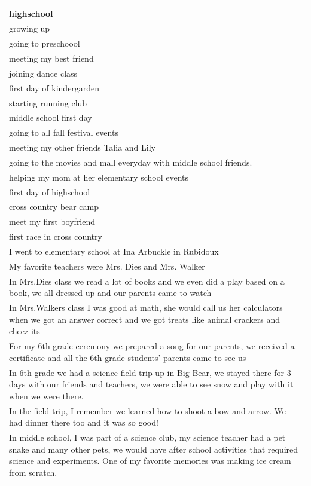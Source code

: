 \documentclass[
  .7em,
  letterpaper,
  DIV=11,
  numbers=noendperiod]{scrartcl}
\begin{document}
\begin{table}
\begin{tabular}{l}
\hline
highschool\\
\hline
growing up\\
\hline
going to preschoool\\
\hline
meeting my best friend\\
\hline
joining dance class\\
\hline
first day of kindergarden\\
\hline
starting running club\\
\hline
middle school first day\\
\hline
going to all fall festival events\\
\hline
meeting my other friends Talia and Lily\\
\hline
going to the movies and mall everyday with middle school friends.\\
\hline
helping my mom at her elementary school events\\
\hline
first day of highschool\\
\hline
cross country bear camp\\
\hline
meet my first boyfriend\\
\hline
first race in cross country\\
\hline
I went to elementary school at Ina Arbuckle in Rubidoux\\
\hline
My favorite teachers were Mrs. Dies and Mrs. Walker\\
\hline
In Mrs.Dies class we read a lot of books and we even did a play based on a book, we all dressed up and our parents came to watch\\
\hline
In Mrs.Walkers class I was good at math, she would call us her calculators when we got an answer correct and we got treats like animal crackers and cheez-its\\
\hline
For my 6th grade ceremony we prepared a song for our parents, we received a certificate and all the 6th grade students' parents came to see us\\
\hline
In 6th grade we had a science field trip up in Big Bear, we stayed there for 3 days with our friends and teachers, we were able to see snow and play with it when we were there.\\
\hline
In the field trip, I remember we learned how to shoot a bow and arrow. We had dinner there too and it was so good!\\
\hline
In middle school, I was part of a science club, my science teacher had a pet snake and many other pets, we would have after school activities that required science and experiments. One of my favorite memories was making ice cream from scratch.\\

\end{tabular}
\end{table}
\end{document}
